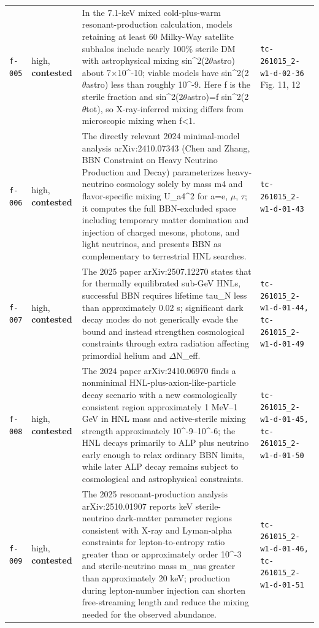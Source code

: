 \documentclass[11pt,a4paper]{article}
\begin{document}
\begin{longtable}{@{}p{}p{}p{}p{}@{}}
\texttt{f-005} & high, \textbf{contested} & In the 7.1-keV mixed cold-plus-warm resonant-production calculation, models retaining at least 60 Milky-Way satellite subhalos include nearly 100\% sterile DM with astrophysical mixing sin\textasciicircum{}2(2$\theta$astro) about 7$\times$10\textasciicircum{}-10; viable models have sin\textasciicircum{}2(2$\theta$astro) less than roughly 10\textasciicircum{}-9. Here f is the sterile fraction and sin\textasciicircum{}2(2$\theta$astro)=f sin\textasciicircum{}2(2$\theta$tot), so X-ray-inferred mixing differs from microscopic mixing when f\textless{}1. & \texttt{tc-261015\_\allowbreak{}2-w1-d-02-36} Fig. 11, 12 \\
\texttt{f-006} & high, \textbf{contested} & The directly relevant 2024 minimal-model analysis arXiv:2410.07343 (Chen and Zhang, BBN Constraint on Heavy Neutrino Production and Decay) parameterizes heavy-neutrino cosmology solely by mass m4 and flavor-specific mixing \textbar{}U\_a4\textbar{}\textasciicircum{}2 for a=e, $\mu$, $\tau$; it computes the full BBN-excluded space including temporary matter domination and injection of charged mesons, photons, and light neutrinos, and presents BBN as complementary to terrestrial HNL searches. & \texttt{tc-261015\_\allowbreak{}2-w1-d-01-43} \\
\texttt{f-007} & high, \textbf{contested} & The 2025 paper arXiv:2507.12270 states that for thermally equilibrated sub-GeV HNLs, successful BBN requires lifetime tau\_N less than approximately 0.02 s; significant dark decay modes do not generically evade the bound and instead strengthen cosmological constraints through extra radiation affecting primordial helium and $\Delta$N\_eff. & \texttt{tc-261015\_\allowbreak{}2-w1-d-01-44,\allowbreak{} tc-261015\_\allowbreak{}2-w1-d-01-49} \\
\texttt{f-008} & high, \textbf{contested} & The 2024 paper arXiv:2410.06970 finds a nonminimal HNL-plus-axion-like-particle decay scenario with a new cosmologically consistent region approximately 1 MeV--1 GeV in HNL mass and active-sterile mixing strength approximately 10\textasciicircum{}-9--10\textasciicircum{}-6; the HNL decays primarily to ALP plus neutrino early enough to relax ordinary BBN limits, while later ALP decay remains subject to cosmological and astrophysical constraints. & \texttt{tc-261015\_\allowbreak{}2-w1-d-01-45,\allowbreak{} tc-261015\_\allowbreak{}2-w1-d-01-50} \\
\texttt{f-009} & high, \textbf{contested} & The 2025 resonant-production analysis arXiv:2510.01907 reports keV sterile-neutrino dark-matter parameter regions consistent with X-ray and Lyman-alpha constraints for lepton-to-entropy ratio greater than or approximately order 10\textasciicircum{}-3 and sterile-neutrino mass m\_nus greater than approximately 20 keV; production during lepton-number injection can shorten free-streaming length and reduce the mixing needed for the observed abundance. & \texttt{tc-261015\_\allowbreak{}2-w1-d-01-46,\allowbreak{} tc-261015\_\allowbreak{}2-w1-d-01-51} \\

\end{longtable}
\end{document}
